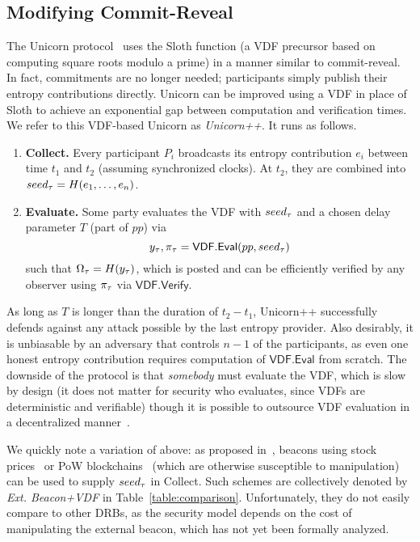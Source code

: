 \subsection{Modifying Commit-Reveal}
\label{subsection:modifying-commit-reveal}
The Unicorn protocol~\cite{lenstra2015random} uses the Sloth function (a VDF precursor based on computing square roots modulo a prime) in a manner similar to commit-reveal. In fact, commitments are no longer needed; participants simply publish their entropy contributions directly. Unicorn can be improved using a VDF in place of Sloth to achieve an exponential gap between computation and verification times. We refer to this VDF-based Unicorn as \textit{Unicorn++}. It runs as follows.
\begin{enumerate}
    \item \textbf{Collect.} Every participant $P_i$ broadcasts its entropy contribution $e_i$ between time $t_1$ and $t_2$ (assuming synchronized clocks). At $t_2$, they are combined into $seed_\tau = H(e_1,\ldots, e_n)$.
    \item \textbf{Evaluate.} Some party evaluates the VDF with $seed_\tau$ and a chosen delay parameter $T$ (part of $pp$) via
    $$y_\tau, \pi_\tau = \mathsf{VDF.Eval}(pp, seed_\tau)$$
    such that $\Omega_\tau = H(y_\tau)$, which is posted and can be efficiently verified by any observer using $\pi_\tau$ via $\mathsf{VDF.Verify}$.
\end{enumerate}

As long as $T$ is longer than the duration of $t_2 - t_1$, Unicorn++ successfully defends against any attack possible by the last entropy provider. Also desirably, it is unbiasable by an adversary that controls $n - 1$ of the participants, as even one honest entropy contribution requires computation of $\mathsf{VDF.Eval}$ from scratch. The downside of the protocol is that \emph{somebody} must evaluate the VDF, which is slow by design (it does not matter for security who evaluates, since VDFs are deterministic and verifiable) though it is possible to outsource VDF evaluation in a decentralized manner~\cite{thyagarajan2021opensquare}.

We quickly note a variation of above: as proposed in~\cite{bunz2017proofs, bonneau2015bitcoin}, beacons using stock prices~\cite{clark2010use} or PoW blockchains~\cite{nakamoto2008bitcoin, bentov2016bitcoin, han2020randchain} (which are otherwise susceptible to manipulation) can be used to supply $seed_\tau$ in Collect. Such schemes are collectively denoted by \textit{Ext. Beacon+VDF} in Table~\ref{table:comparison}.
Unfortunately, they do not easily compare to other DRBs, as the security model depends on the cost of manipulating the external beacon, which has not yet been formally analyzed.

